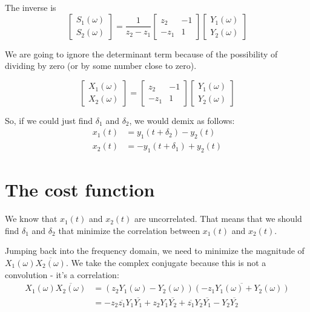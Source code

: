 The inverse is
\begin{equation}
  \begin{bmatrix}
    S_1(\omega)\\
    S_2(\omega)
  \end{bmatrix}
  =
  \frac{1}{z_2-z_1}
  \begin{bmatrix}
  z_2 & -1\\
  -z_1 & 1
  \end{bmatrix}
  \begin{bmatrix}
  Y_1(\omega)\\
  Y_2(\omega)
    \end{bmatrix}
 \end{equation}   

We are going to ignore the determinant term because of the possibility of dividing by zero (or by some number close to zero).

\begin{equation}
  \begin{bmatrix}
    X_1(\omega)\\
    X_2(\omega)
  \end{bmatrix}
  =
  \begin{bmatrix}
  z_2 & -1\\
  -z_1 & 1
  \end{bmatrix}
  \begin{bmatrix}
  Y_1(\omega)\\
  Y_2(\omega)
    \end{bmatrix}
 \end{equation}   


So, if we could just find $\delta_1$ and $\delta_2$, we would demix as follows:
\begin{align}
  x_1(t) & = y_1(t+\delta_2) - y_2(t) \\
  x_2(t) & = -y_1(t+\delta_1) + y_2(t)
\end{align}


\section{The cost function}

We know that $x_1(t)$ and $x_2(t)$ are uncorrelated. That means that
we should find $\delta_1$ and $\delta_2$ that minimize the correlation
between $x_1(t)$ and $x_2(t)$.

Jumping back into the frequency domain, we need to minimize the
magnitude of $X_1(\omega) \overline{X_2(\omega)}$. We take the complex
conjugate because this is not a convolution - it's a correlation:
\begin{align}
  X_1(\omega) \overline{X_2(\omega)} & = \left(z_2 Y_1(\omega) - Y_2(\omega)\right) \overline{\left(-z_1 Y_1(\omega) + Y_2(\omega)\right) }\\
  & = -z_2 \overline{z_1} Y_1 \overline{Y_1} + z_2 Y_1 \overline{Y_2} + \overline{z_1} Y_2 \overline{Y_1} - Y_2 \overline{Y_2}
\end{align}

